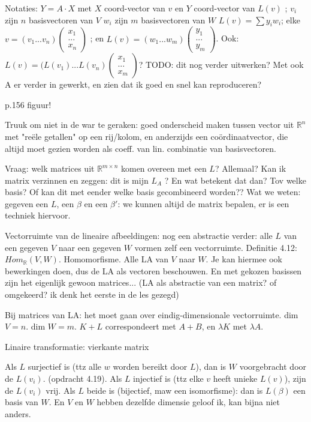 \documentclass{article}
\begin{document}
Notaties: $Y = A \cdot X$ met $X$ coord-vector van $v$ en $Y$ coord-vector van $L(v)$ ; 
$v_i$ zijn $n$ basisvectoren van $V$
$w_i$ zijn $m$ basisvectoren van $W$ 
$L(v) = \sum y_i w_i$; 
elke $v = (v_1 ... v_n) \begin{pmatrix} x_1 \\ ... \\x_n \end{pmatrix}$ ; en $L(v) = (w_1 ... w_m) \begin{pmatrix} y_1 \\ ... \\y_m \end{pmatrix}$. 
Ook: $L(v) = ( L(v_1) ... L(v_n) \begin{pmatrix} x_1 \\ ... \\x_m \end{pmatrix}$? 
TODO: dit nog verder uitwerken? Met ook A er verder in gewerkt, en zien dat ik goed en snel kan reproduceren? 

p.156 figuur! 

Truuk om niet in de war te geraken: goed onderscheid maken tussen vector uit $\mathbb{R}^n$ met "re\"ele getallen" op een rij/kolom, en anderzijds een co\"ordinaatvector, die altijd moet gezien worden als coeff. van lin. combinatie van basisvectoren. 

Vraag: welk matrices uit $\mathbb{R}^{m \times n} $ komen overeen met een $L$? Allemaal? Kan ik matrix verzinnen en zeggen: dit is mijn $L_A$ ? En wat betekent dat dan? Tov welke basis? Of kan dit met eender welke basis gecombineerd worden?? 
Wat we weten: gegeven een $L$, een $\beta$ en een $\beta'$: we kunnen altijd de matrix bepalen, er is een techniek hiervoor. 

Vectorruimte van de lineaire afbeeldingen: nog een abstractie verder: alle $L$ van een gegeven $V$ naar een gegeven $W$ vormen zelf een vectorruimte. 
Definitie 4.12: $Hom_{\mathbb{R}}(V,W)$. Homomorfisme. Alle LA van $V$ naar $W$. Je kan hiermee ook bewerkingen doen, dus de LA als vectoren beschouwen. 
En met gekozen basissen zijn het eigenlijk gewoon matrices... 
(LA als abstractie van een matrix? of omgekeerd? ik denk het eerste in de les gezegd) 

Bij matrices van LA: het moet gaan over eindig-dimensionale vectorruimte. dim $V = n$. dim $W = m$. $K+L$ correspondeert met $A+B$, en $\lambda K$ met $\lambda A$. 

Linaire transformatie: vierkante matrix

Als $L$ surjectief is (ttz alle $w$ worden bereikt door $L$), dan is $W$ voorgebracht door de $L(v_i)$. (opdracht 4.19). 
Als $L$ injectief is (ttz elke $v$ heeft unieke $L(v)$), zijn de $L(v_i)$ vrij. 
Als $L$ beide is (bijectief, maw een isomorfisme): dan is $L(\beta)$ een basis van $W$. En $V$ en $W$ hebben dezelfde dimensie geloof ik, kan bijna niet anders. 
\end{document}
